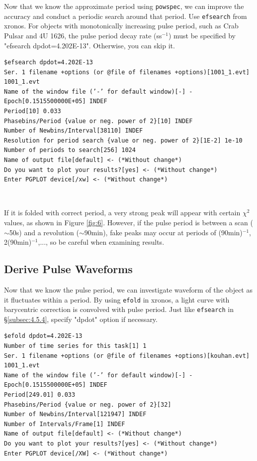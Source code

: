 \documentclass[10pt]{report}
\renewcommand{\_}{\textscale{.5}{\textbf{\textunderscore}}}
\begin{document}
Now that we know the approximate period using \texttt{powspec}, we can improve the accuracy and conduct a periodic search around that period. Use \texttt{efsearch} from xronos. For objects with monotonically increasing pulse period, such as Crab Pulsar and 4U 1626, the pulse period decay rate (ss$^{-1}$) must be specified by "efsearch dpdot=4.202E-13". Otherwise, you can skip it. \\

\begin{lstlisting}
$efsearch dpdot=4.202E-13
Ser. 1 filename +options (or @file of filenames +options)[1001_1.evt] 1001_1.evt
Name of the window file (’-’ for default window)[-] -
Epoch[0.1515500000E+05] INDEF
Period[10] 0.033
Phasebins/Period {value or neg. power of 2}[10] INDEF
Number of Newbins/Interval[38110] INDEF
Resolution for period search {value or neg. power of 2}[1E-2] 1e-10
Number of periods to search[256] 1024
Name of output file[default] <- (*Without change*)
Do you want to plot your results?[yes] <- (*Without change*)
Enter PGPLOT device[/xw] <- (*Without change*)
\end{lstlisting}

\

If it is folded with correct period, a very strong peak will appear with certain $\chi^2$ values, as shown in Figure \ref{fig:6}. However, if the pulse period is between a scan ($\sim$50s) and a revolution ($\sim$90min), fake peaks may occur at periods of (90min)$^{-1}$, 2(90min)$^{-1}$,..., so be careful when examining results. \\

\subsection{Derive Pulse Waveforms}\label{subsec:4.5.5}

Now that we know the pulse period, we can investigate waveform of the object as it fluctuates within a period. By using \texttt{efold} in xronos, a light curve with barycentric correction is convolved with pulse period. Just like \texttt{efsearch} in \S\ref{subsec:4.5.4}, specify "dpdot" option if necessary. \\

\begin{lstlisting}
$efold dpdot=4.202E-13
Number of time series for this task[1] 1
Ser. 1 filename +options (or @file of filenames +options)[kouhan.evt] 1001_1.evt
Name of the window file (’-’ for default window)[-] -
Epoch[0.1515500000E+05] INDEF
Period[249.01] 0.033
Phasebins/Period {value or neg. power of 2}[32]
Number of Newbins/Interval[121947] INDEF
Number of Intervals/Frame[1] INDEF
Name of output file[default] <- (*Without change*)
Do you want to plot your results?[yes] <- (*Without change*)
Enter PGPLOT device[/XW] <- (*Without change*)
\end{lstlisting}
\end{document}

